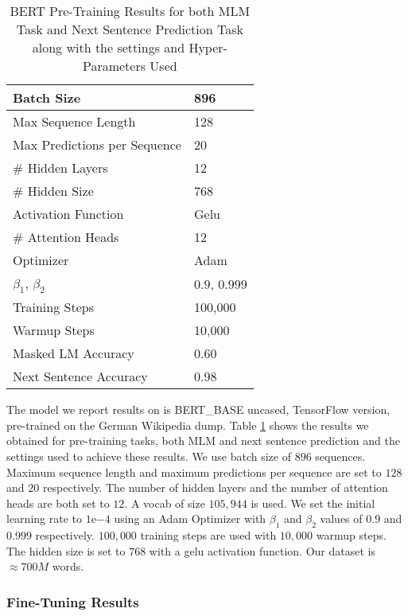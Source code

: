 \begin{table}[!ht]
	\centering
	\begin{tabular}{|l|l|}
		\hline
		Batch Size						&	896				\\ \hline
		Max Sequence Length				&	128				\\ \hline
		Max Predictions per Sequence	&	20 				\\ \hline
		\# Hidden Layers				&	12				\\ \hline
		\# Hidden Size					&	768				\\ \hline
		Activation Function				& 	Gelu			\\ \hline
		\# Attention Heads				& 	12 				\\ \hline
		Optimizer						& 	Adam 			\\ \hline
		$\beta_1$, $\beta_2$ 			& 	$0.9$, $0.999$ 	\\ \hline
		Training Steps 					& 	100,000 		\\ \hline
		Warmup Steps 					& 	10,000 			\\ \hline
		\hline
		Masked LM Accuracy 		 		&   0.60    		\\ \hline
		Next Sentence Accuracy   		&   0.98    		\\ \hline
		
	\end{tabular}
	\caption{BERT Pre-Training Results for both MLM Task and Next Sentence Prediction Task along with the settings and Hyper-Parameters Used}
	\label{results:table2}
\end{table}

The model we report results on is \ac{BERT}\_BASE uncased, TensorFlow version, pre-trained on the German Wikipedia dump. Table \ref{results:table2} shows the results we obtained for pre-training tasks, both \ac{MLM} and next sentence prediction and the settings used to achieve these results. We use batch size of $896$ sequences. Maximum sequence length and maximum predictions per sequence are set to $128$ and $20$ respectively. The number of hidden layers and the number of attention heads are both set to $12$. A vocab of size $105,944$ is used. We set the initial learning rate to $1\mathrm{e}{-4}$ using an Adam Optimizer with $\beta_1$ and $\beta_2$ values of $0.9$ and $0.999$ respectively. $100,000$ training steps are used with $10,000$ warmup steps. The hidden size is set to $768$ with a gelu activation function. Our dataset is $\approx700M$ words.




\subsubsection{Fine-Tuning Results}
\label{res:s2_sub2_subsub2}

